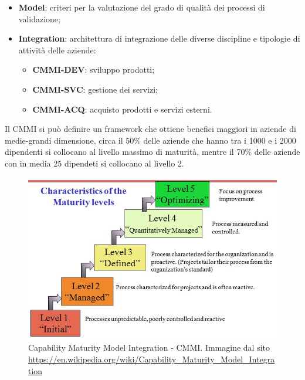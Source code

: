 \begin{itemize}
\begin{itemize}
	\end{itemize}
	\item \textbf{Model}: criteri per la valutazione del grado di qualità dei processi di validazione;
	\item \textbf{Integration}: architettura di integrazione delle diverse discipline e tipologie di attività delle aziende:
	\begin{itemize}
		\item \textbf{CMMI-DEV}: sviluppo prodotti;
		\item \textbf{CMMI-SVC}: gestione dei servizi;
		\item \textbf{CMMI-ACQ}: acquisto prodotti e servizi esterni.
	\end{itemize}	 
\end{itemize}
Il CMMI si può definire un framework che ottiene benefici maggiori in aziende di medie-grandi dimensione, circa il 50\% delle aziende che hanno tra i 1000 e i 2000 dipendenti si collocano al livello massimo di maturità, mentre il 70\% delle aziende con in media 25 dipendeti si collocano al livello 2.

\begin{figure}[H]
\centering
	\includegraphics[width=0.7\linewidth]{./images/Characteristics_of_the_Maturity_levels.jpg} 
	\caption{Capability Maturity Model Integration - CMMI. Immagine dal sito \url{https://en.wikipedia.org/wiki/Capability_Maturity_Model_Integration}}
	\label{cmmi}
\end{figure}



